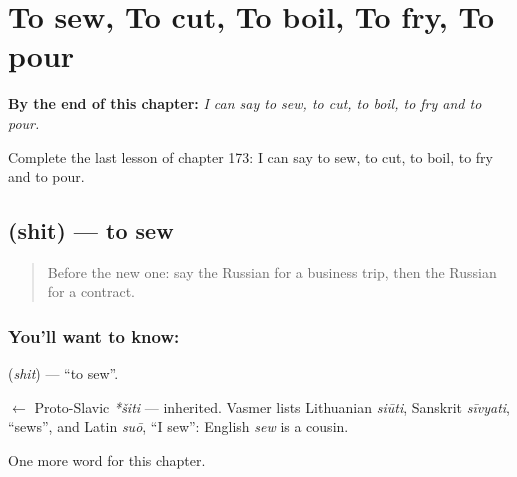 
\chapter{To sew, To cut, To boil, To fry, To pour}
\label{ch:ru-to-sew-to-cut-to-boil-to-fry-to-pour}

\begin{chapteropening}
\textbf{By the end of this chapter:} \emph{I can say to sew, to cut, to boil, to fry and to pour.}

Complete the last lesson of chapter 173: I can say to sew, to cut, to boil, to fry and to pour.
\end{chapteropening}

\section[\texorpdfstring{\ru{шить} (shit)}{шить (shit)}]{ (shit) — to sew}

\label{lesson:RU-C173-shit}



\begin{quote}
Before the new one: say the Russian for a business trip, then the Russian for a contract.
\end{quote}

\subsection*{You'll want to know: }
\textbf{} (\emph{shit}) — \textquotedblleft{}to sew\textquotedblright{}.

\begin{cousinweb}
\textbf{} $\leftarrow$ Proto-Slavic \emph{*šiti} — inherited. Vasmer lists Lithuanian \emph{siūti}, Sanskrit \emph{sīvyati}, \textquotedblleft{}sews\textquotedblright{}, and Latin \emph{suō}, \textquotedblleft{}I sew\textquotedblright{}: English \emph{sew} is a cousin.
\end{cousinweb}

\begin{grammarlens}[title={What you've built}]
One more word for this chapter.
\end{grammarlens}

